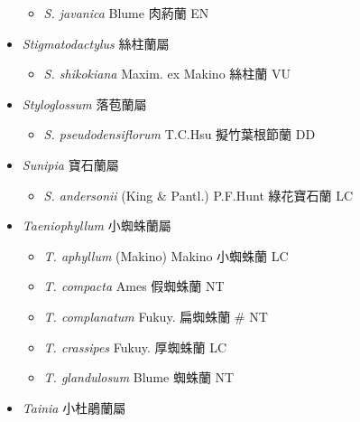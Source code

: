 \begin{itemize}
  \begin{itemize}
        \item[] \textit{S. javanica} Blume  肉葯蘭   EN
  \end{itemize}
 \item[] \textit{Stigmatodactylus} 絲柱蘭屬
                                
  \begin{itemize}
        \item[] \textit{S. shikokiana} Maxim. ex Makino  絲柱蘭   VU
  \end{itemize}
 \item[] \textit{Styloglossum} 落苞蘭屬
                                
  \begin{itemize}
        \item[] \textit{S. pseudodensiflorum} T.C.Hsu  擬竹葉根節蘭   DD
  \end{itemize}
 \item[] \textit{Sunipia} 寶石蘭屬
                                
  \begin{itemize}
        \item[] \textit{S. andersonii} (King \& Pantl.) P.F.Hunt  綠花寶石蘭   LC
  \end{itemize}
 \item[] \textit{Taeniophyllum} 小蜘蛛蘭屬
                                
  \begin{itemize}
        \item[] \textit{T. aphyllum} (Makino) Makino  小蜘蛛蘭   LC
        \item[] \textit{T. compacta} Ames  假蜘蛛蘭   NT
        \item[] \textit{T. complanatum} Fukuy.  扁蜘蛛蘭  \# NT
        \item[] \textit{T. crassipes} Fukuy.  厚蜘蛛蘭   LC
        \item[] \textit{T. glandulosum} Blume  蜘蛛蘭   NT
  \end{itemize}
 \item[] \textit{Tainia} 小杜鵑蘭屬
                                

\end{itemize}
